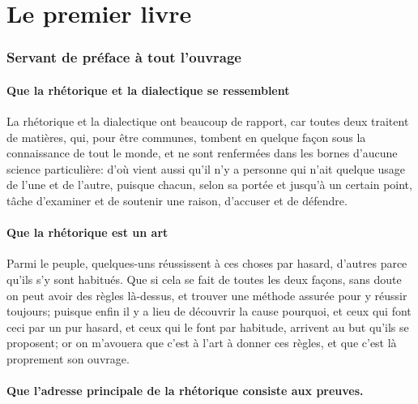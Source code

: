
\part{Le premier livre}
\section{Servant de préface à tout l'ouvrage}

\subsection{Que la rhétorique et la dialectique se  ressemblent}

La rhétorique et la dialectique  ont beaucoup de rapport, car  toutes deux traitent de matières, qui, pour être communes, tombent
en quelque façon sous la connaissance de tout le monde, et ne sont renfermées dans les bornes d'aucune science particulière: d'où
vient aussi qu'il n'y a personne qui n'ait quelque usage de l'une et de l'autre, puisque chacun, selon sa portée et jusqu'à un
certain point, tâche d'examiner et de soutenir une raison, d'accuser et de défendre.

\subsection{Que la rhétorique est un art}

Parmi le peuple, quelques-uns réussissent à ces choses par hasard, d'autres parce qu'ils s'y sont habitués. Que si cela se fait
de toutes les deux façons, sans doute on peut avoir des règles là-dessus, et trouver une méthode assurée pour y réussir toujours;
puisque enfin il y a lieu de découvrir la cause pourquoi, et ceux qui font ceci par un pur hasard, et ceux qui le font par habitude,
arrivent au but qu'ils se proposent; or on m'avouera que c'est à l'art à donner ces règles, et que c'est là proprement son ouvrage.

\subsection{Que l'adresse principale de la rhétorique consiste aux preuves.}

